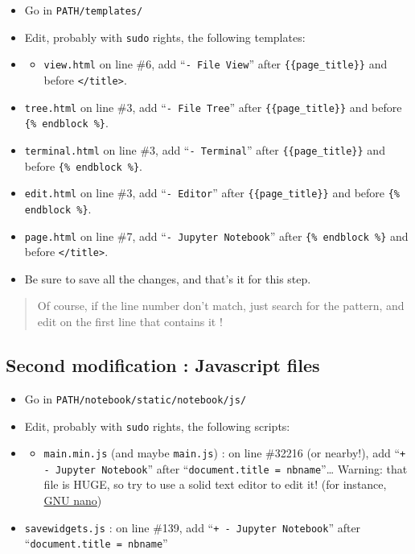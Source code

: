 \documentclass[]{article}
\providecommand{\tightlist}{%
  \setlength{\itemsep}{0pt}\setlength{\parskip}{0pt}}
\begin{document}
\begin{itemize}
\item
  Go in \texttt{PATH/templates/}
\item
  Edit, probably with \texttt{sudo} rights, the following templates:
\item
  \begin{itemize}
  \tightlist
  \item
    \texttt{view.html} on line \#6, add ``\texttt{- File View}'' after
    \texttt{\{\{page\_title\}\}} and before
    \texttt{\textless{}/title\textgreater{}}.
  \end{itemize}
\item
  \texttt{tree.html} on line \#3, add ``\texttt{- File Tree}'' after
  \texttt{\{\{page\_title\}\}} and before \texttt{\{\% endblock \%\}}.
\item
  \texttt{terminal.html} on line \#3, add ``\texttt{- Terminal}'' after
  \texttt{\{\{page\_title\}\}} and before \texttt{\{\% endblock \%\}}.
\item
  \texttt{edit.html} on line \#3, add ``\texttt{- Editor}'' after
  \texttt{\{\{page\_title\}\}} and before \texttt{\{\% endblock \%\}}.
\item
  \texttt{page.html} on line \#7, add ``\texttt{- Jupyter Notebook}''
  after \texttt{\{\% endblock \%\}} and before
  \texttt{\textless{}/title\textgreater{}}.
\item
  Be sure to save all the changes, and that's it for this step.
\end{itemize}

\begin{quote}
Of course, if the line number don't match, just search for the pattern,
and edit on the first line that contains it !
\end{quote}

\subsection{Second modification : Javascript
files}\label{second-modification-javascript-files}

\begin{itemize}
\item
  Go in \texttt{PATH/notebook/static/notebook/js/}
\item
  Edit, probably with \texttt{sudo} rights, the following scripts:
\item
  \begin{itemize}
  \tightlist
  \item
    \texttt{main.min.js} (and maybe \texttt{main.js}) : on line \#32216
    (or nearby!), add
    ``\texttt{+ \textquotesingle{} - Jupyter Notebook\textquotesingle{}}''
    after ``\texttt{document.title = nbname}''\ldots{} Warning:
    that file is HUGE, so try to use a solid text editor to edit it!
    (for instance, \href{https://www.nano-editor.org/}{GNU nano})
  \end{itemize}
\item
  \texttt{savewidgets.js} : on line \#139, add
  ``\texttt{+ \textquotesingle{} - Jupyter Notebook\textquotesingle{}}''
  after ``\texttt{document.title = nbname}''
\end{itemize}
\end{document}
